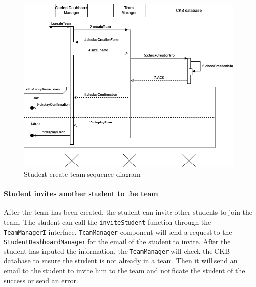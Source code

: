 \begin{figure}[H]
    \begin{center}
        \includegraphics[width=\linewidth]{Images/sequence/Sd_teamcreation.png}
        \caption{Student create team sequence diagram}
        \label{fig:student_create_team}
    \end{center}
\end{figure}


\paragraph{Student invites another student to the team}
After the team has been created, the student can invite other students to join the team. 
The student can call the \verb|inviteStudent| function through the \verb|TeamManagerI| interface.
\verb|TeamManager| component will send a request to the \verb|StudentDashboardManager| for the email of the student to invite. 
After the student has inputed the information, the \verb|TeamManager| will check the CKB database to ensure the student is not already in a team.
Then it will send an email to the student to invite him to the team and notificate the student of the success or send an error.

